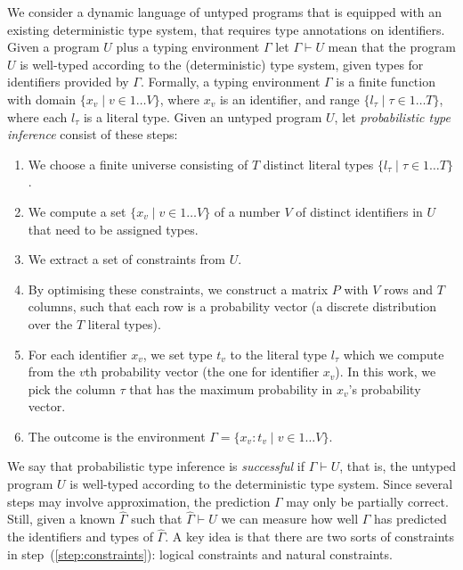 \documentclass[acmsmall,nonacm]{acmart}\settopmatter{printfolios=true,printccs=false,printacmref=false}
\begin{document}
We consider a dynamic language of untyped programs that is equipped with an existing deterministic type system,
that requires type annotations on identifiers.
%
Given a program $U$ plus a typing environment $\Gamma$ let $\Gamma \vdash U$ mean that the program $U$ is well-typed according to the (deterministic) type system, given types for identifiers provided by $\Gamma$.
%
Formally, a typing environment $\Gamma$ is a finite function
with domain $\{ x_v \mid v \in 1 \ldots V\}$, where $x_v$  is an identifier, and range $\{ l_\tau \mid \tau \in 1 \dots T \}$, where each $l_\tau$ is a literal type.
Given an untyped program $U$,
let \emph{probabilistic type inference} consist of these steps:
\begin{enumerate}
	\item We choose a finite universe consisting of $T$ distinct literal types $\{ l_\tau \mid \tau \in 1 \dots T \}$.
	\item We compute a set $\{ x_v \mid v \in 1 \ldots V\}$ of a number $V$ of distinct identifiers in $U$ that need to be assigned types.
	\item \label{step:constraints} We extract a set of constraints from $U$.
	\item \label{step:optimise} By optimising these constraints, we construct a matrix $P$ with $V$ rows and $T$ columns,
	      such that each row is a probability vector
	      (a discrete distribution over the $T$ literal types).
	\item For each identifier $x_v$, we set type $t_v$ to the literal type $l_\tau$ which we compute from the $v$th probability vector (the one for identifier $x_v$).  In this work, we pick the column $\tau$ that has the maximum probability in $x_v$'s probability vector.
	\item The outcome is the environment $\Gamma = \{ x_v : t_v \mid v \in 1 \ldots V\}$.
\end{enumerate}

We say that probabilistic type inference is \emph{successful} if $\Gamma \vdash U$, that is, the untyped program $U$ is well-typed according to the deterministic type system.
%
Since several steps may involve approximation, the prediction $\Gamma$ may only be partially correct.
%
Still, given a known $\hat{\Gamma}$ such that $\hat{\Gamma} \vdash U$ we can measure how well $\Gamma$ has predicted the identifiers and types of $\hat{\Gamma}$.
%
A key idea is that there are two sorts of constraints in step~(\ref{step:constraints}): logical constraints and natural
constraints.
\end{document}
